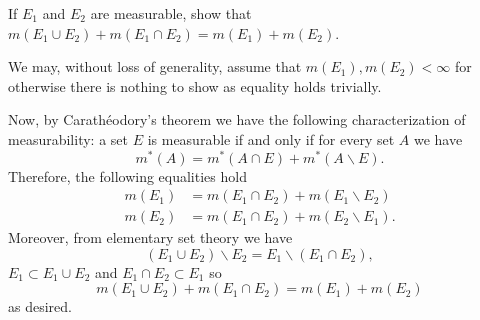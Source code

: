 \begin{problem}
  If $E_1$ and $E_2$ are measurable, show that
  $m(E_1\cup E_2)+m(E_1\cap E_2)=m(E_1)+m(E_2)$.
\end{problem}
\begin{solution}
  We may, without loss of generality, assume that $m(E_1),m(E_2)<\infty$
  for otherwise there is nothing to show as equality holds trivially.

  Now, by Carathéodory's theorem we have the following characterization of
  measurability: a set $E$ is measurable if and only if for every set $A$
  we have
  \[
    m^*(A)=m^*(A\cap E)+m^*(A\smallsetminus E).
  \]
  Therefore, the following equalities hold 
  \begin{align*}
    m(E_1)&=m(E_1\cap E_2)+m(E_1\smallsetminus E_2)\\
    m(E_2)&=m(E_1\cap E_2)+m(E_2\smallsetminus E_1).
  \end{align*}
  Moreover, from elementary set theory we have
  \[
    (E_1\cup E_2)\smallsetminus E_2=E_1\smallsetminus (E_1\cap E_2),
  \]
  $E_1\subset E_1\cup E_2$ and $E_1\cap E_2\subset E_1$ so
  \[
    m(E_1\cup E_2)+m(E_1\cap E_2)=m(E_1)+m(E_2)
  \]
  as desired.
\end{solution}

